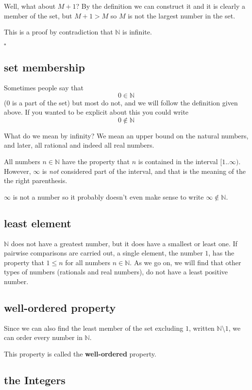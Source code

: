 \documentclass[11pt, oneside]{article}
\begin{document}
Well, what about $M + 1$?  By the definition we can construct it and it is clearly a member of the set, but $M + 1 > M$ so $M$ is not the largest number in the set.

This is a proof by contradiction that $\mathbb{N}$ is infinite.

$\square$

\subsection*{set membership}

Sometimes people say that
\[ 0 \in \mathbb{N} \]
(0 is a part of the set) but most do not, and we will follow the definition given above.  If you wanted to be explicit about this you could write
\[ 0 \notin \mathbb{N} \]

What do we mean by infinity?  We mean an upper bound on the natural numbers, and later, all rational and indeed all real numbers.  

All numbers $n \in \mathbb{N}$ have the property that $n$ is contained in the interval $[1..\infty)$.  However, $\infty$ is \emph{not} considered part of the interval, and that is the meaning of the the right parenthesis.

$\infty$ is not a number so it probably doesn't even make sense to write $\infty \notin \mathbb{N}$.

\subsection*{least element}

$\mathbb{N}$ does not have a greatest number, but it does have a smallest or least one.  If pairwise comparisons are carried out, a single element, the number $1$, has the property that $1 \le n$ for all numbers $n \in \mathbb{N}$.  As we go on, we will find that other types of numbers (rationals and real numbers), do not have a least positive number.

\subsection*{well-ordered property}

Since we can also find the least member of the set excluding $1$, written $\mathbb{N} \setminus 1$, we can order every number in $\mathbb{N}$.  

This property is called the \textbf{well-ordered} property.

\subsection*{the Integers}
\end{document}
